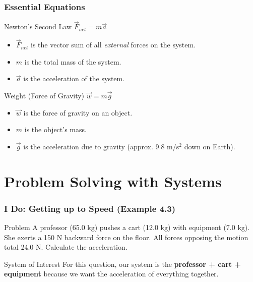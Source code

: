 \documentclass{beamer}
\begin{document}
\begin{frame}
\frametitle{Essential Equations}
\begin{block}{Newton's Second Law}
\centering
$\vec{F}_{net} = m\vec{a}$
\begin{itemize}
    \item $\vec{F}_{net}$ is the vector sum of all \textit{external} forces on the system.
    \item $m$ is the total mass of the system.
    \item $\vec{a}$ is the acceleration of the system.
\end{itemize}
\end{block}
\pause
\begin{block}{Weight (Force of Gravity)}
\centering
$\vec{w} = m\vec{g}$
\begin{itemize}
    \item $\vec{w}$ is the force of gravity on an object.
    \item $m$ is the object's mass.
    \item $\vec{g}$ is the acceleration due to gravity (approx. 9.8 m/s$^2$ down on Earth).
\end{itemize}
\end{block}
\end{frame}

\section{Problem Solving with Systems}

\begin{frame}
\frametitle{I Do: Getting up to Speed (Example 4.3)}
\begin{block}{Problem}
A professor (65.0 kg) pushes a cart (12.0 kg) with equipment (7.0 kg). She exerts a 150 N backward force on the floor. All forces opposing the motion total 24.0 N. Calculate the acceleration.
\end{block}
\pause
\begin{alertblock}{System of Interest}
For this question, our system is the \textbf{professor + cart + equipment} because we want the acceleration of everything together.
\end{alertblock}
\end{frame}
\end{document}
